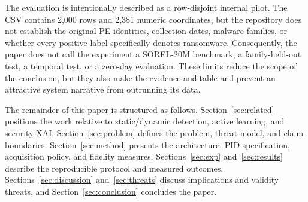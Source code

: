The evaluation is intentionally described as a row-disjoint internal pilot. The
CSV contains 2,000 rows and 2,381 numeric coordinates, but the repository does
not establish the original PE identities, collection dates, malware families, or
whether every positive label specifically denotes ransomware. Consequently, the
paper does not call the experiment a SOREL-20M benchmark, a family-held-out
test, a temporal test, or a zero-day evaluation. These limits reduce the scope of
the conclusion, but they also make the evidence auditable and prevent an
attractive system narrative from outrunning its data.

The remainder of this paper is structured as follows. Section~\ref{sec:related}
positions the work relative to static/dynamic detection, active learning, and
security XAI. Section~\ref{sec:problem} defines the problem, threat model, and
claim boundaries. Section~\ref{sec:method} presents the architecture, PID
specification, acquisition policy, and fidelity measures. Sections~\ref{sec:exp}
and~\ref{sec:results} describe the reproducible protocol and measured outcomes.
Sections~\ref{sec:discussion} and~\ref{sec:threats} discuss implications and
validity threats, and Section~\ref{sec:conclusion} concludes the paper.
